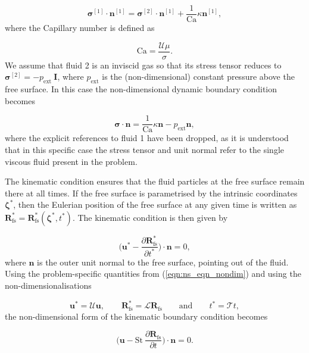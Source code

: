 \documentclass[aip,graphicx]{revtex4-1}
\newcommand{\sym}[1]{\text{#1}}
\newcommand{\pder}[2][]{\frac{\partial#1}{\partial#2}}
\newcommand{\vect}[1]{\bm{#1}}
\begin{document}
\begin{equation}
 \vect{\sigma}^{[1]} \cdot \vect{n}^{[1]} = \vect{\sigma}^{[2]} \cdot \vect{n}^{[1]} + \frac{1}{\sym{Ca}} \kappa \vect{n}^{[1]},
\end{equation}
where the Capillary number is defined as

\begin{equation}
 \sym{Ca} = \frac{\mathcal{U} \mu}{\sigma}.
\end{equation}
We assume that fluid 2 is an inviscid gas so that its stress tensor reduces to $\vect{\sigma}^{[2]}=-p_{\sym{ext}} \: \vect{I}$, where $p_{\sym{ext}}$ is the (non-dimensional) constant pressure above the free surface. 
In this case the non-dimensional dynamic boundary condition becomes

\begin{equation}
 \vect{\sigma} \cdot \vect{n} = \frac{1}{\sym{Ca}} \kappa \vect{n} - p_{\sym{ext}} \vect{n},
 \label{eqn:ns_eqn_dynamic_fs_bc_non_dim}
\end{equation}
where the explicit references to fluid 1 have been dropped, as it is understood that in this specific case the stress tensor and unit normal refer to the single viscous fluid present in the problem.

The kinematic condition ensures that the fluid particles at the free surface remain there at all times. 
If the free surface is parametrised by the intrinsic coordinates $\vect{\zeta}^*$, then the Eulerian position of the free surface at any given time is written as $\vect{R}_{\sym{fs}}^*=\vect{R}_{\sym{fs}}^*(\vect{\zeta}^*,t^*)$.
The kinematic condition is then given by

\begin{equation}
 \Bigg( \vect{u}^* - \pder[\vect{R}_{\sym{fs}}^*]{t^*} \Bigg) \cdot \vect{n} = 0,
\end{equation}
where $\vect{n}$ is the outer unit normal to the free surface, pointing out of the fluid. 
Using the problem-specific quantities from (\ref{eqn:ns_eqn_nondim}) and using the non-dimensionalisations

\begin{equation}
 \vect{u}^* = \mathcal{U} \vect{u}, \qquad \vect{R}_{\sym{fs}}^* = \mathcal{L} \vect{R}_{\sym{fs}} \qquad \text{and} \qquad t^*=\mathcal{T} t,
\end{equation}
the non-dimensional form of the kinematic boundary condition becomes

\begin{equation}
 \Bigg( \vect{u} - \sym{St} \: \pder[\vect{R}_{\sym{fs}}]{t} \Bigg) \cdot \vect{n} = 0.
 \label{eqn:ns_eqn_kinematic_fs_bc_non_dim}
\end{equation}
\end{document}
